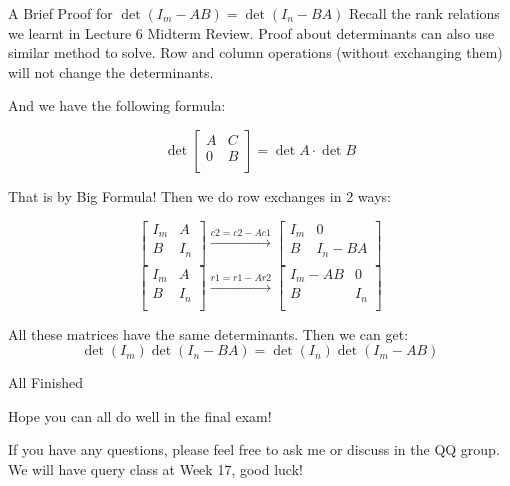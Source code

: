 \documentclass{beamer}
\begin{document}
\begin{frame}{A Brief Proof for $\det(I_m-AB)=\det(I_n-BA)$}
Recall the rank relations we learnt in Lecture 6 Midterm Review. Proof about determinants can also use similar method to solve. Row and column operations (without exchanging them) will not change the determinants.

\vspace{3pt}
And we have the following formula:

\begin{equation*}
    \det \left[ \begin{matrix}
        A&		C\\
        0&		B\\
    \end{matrix} \right] =\det A\cdot \det B
\end{equation*}

That is by Big Formula! Then we do row exchanges in 2 ways:

\begin{equation*}
    \left[ \begin{matrix}
        I_m&		A\\
        B&		I_n\\
    \end{matrix} \right] \xrightarrow{c2=c2-Ac1}\left[ \begin{matrix}
        I_m&		0\\
        B&		I_n-BA\\
    \end{matrix} \right]
\end{equation*}
\begin{equation*}
    \left[ \begin{matrix}
        I_m&		A\\
        B&		I_n\\
    \end{matrix} \right] \xrightarrow{r1=r1-Ar2}\left[ \begin{matrix}
        I_m-AB&		0\\
        B&		I_n\\
    \end{matrix} \right]
\end{equation*}

All these matrices have the same determinants. Then we can get:
\begin{equation*}
    \det \left( I_m \right) \det \left( I_n-BA \right) =\det \left( I_n \right) \det \left( I_m-AB \right)
\end{equation*}
\end{frame}

\begin{frame}{All Finished}
    \begin{LARGE}

    \begin{center}
        Hope you can all do well in the final exam!
    \end{center}
\end{LARGE}

\vspace{30pt}
If you have any questions, please feel free to ask me or discuss in the QQ group. We will have query class at Week 17, good luck!

\end{frame}
\end{document}

